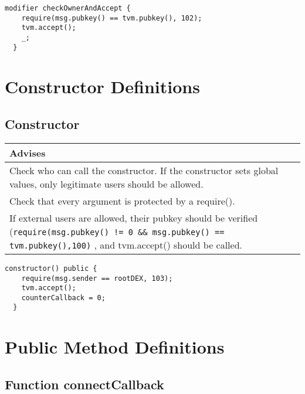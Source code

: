\begin{lstlisting}[firstnumber=79]
  modifier checkOwnerAndAccept {
    require(msg.pubkey() == tvm.pubkey(), 102);
    tvm.accept();
    _;
  }
\end{lstlisting}

\section{Constructor Definitions}


\subsection{Constructor}


\ifsoldraft
\noindent\begin{tabular}{|p{12cm}|}\hline
\rowcolor{green}Advises
\\\hline
Check who can call the constructor. If the constructor sets global values, only legitimate users should be allowed.
\\\hline
Check that every argument is protected by a require().
\\\hline
If external users are allowed, their pubkey should be verified (\verb+require(msg.pubkey() != 0 && msg.pubkey() == tvm.pubkey(),100)+ , and tvm.accept() should be called.
\\\hline\end{tabular}
\fi
\vspace{2cm}

\begin{lstlisting}[firstnumber=85]
  constructor() public {
    require(msg.sender == rootDEX, 103);
    tvm.accept();
    counterCallback = 0;
  }
\end{lstlisting}

\section{Public Method Definitions}


\subsection{Function connectCallback}


